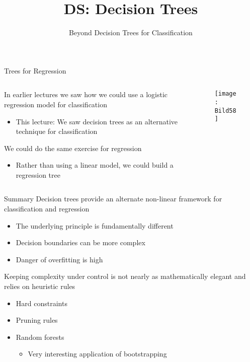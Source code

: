 \documentclass[aspectratio=169]{../latex_main/tntbeamer}  %
\title[Introduction]{DS: Decision Trees}
\subtitle{Beyond Decision Trees for Classification}
\begin{document}
	
	\maketitle
	\begin{frame}{Trees for Regression}
	    \begin{columns}
	    \begin{column}{.5\textwidth}
	        In earlier lectures we saw how we could use a logistic regression model for classification
            \begin{itemize}
                \item This lecture: We saw decision trees as an alternative technique for classification
            \end{itemize}
            \bigskip
            We could do the same exercise for regression
            \begin{itemize}
                \item Rather than using a linear model, we could build a regression tree
            \end{itemize}
        \end{column}
	    
        \begin{column}{.5\textwidth}
            
        
	        \begin{figure}
	            \centering
	            \texttt{[image: Bild58]}
	        \end{figure}
	   \end{column}
	    \end{columns}
	\end{frame}
	
	
	
	\begin{frame}{Summary}
	    Decision trees provide an alternate non-linear framework for classification and regression
	    \begin{itemize}
	        \item The underlying principle is fundamentally different
	        \item Decision boundaries can be more complex
	        \item Danger of overfitting is high
	    \end{itemize}
	    \bigskip
	    Keeping complexity under control is not nearly as mathematically elegant and relies on heuristic rules
	    \begin{itemize}
	        \item Hard constraints
	        \item Pruning rules
	        \item Random forests
	        \begin{itemize}
	            \item Very interesting application of bootstrapping
	        \end{itemize}
	    \end{itemize}
	\end{frame}
	
\end{document}
